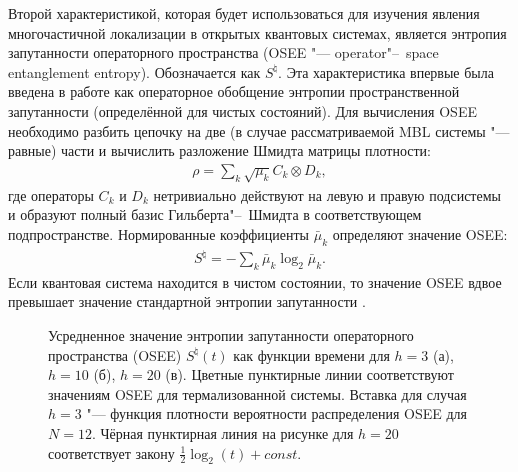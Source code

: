 Второй характеристикой, которая будет использоваться для изучения явления многочастичной локализации в открытых квантовых системах, является энтропия запутанности операторного пространства (OSEE "--- operator"--~space entanglement entropy). Обозначается как \(S^{\natural}\). 
Эта характеристика впервые была введена в работе \cite{Prosen2007} как операторное обобщение энтропии пространственной запутанности (определённой для чистых состояний).
Для вычисления OSEE необходимо разбить цепочку на две (в случае рассматриваемой MBL системы "--- равные) части и вычислить разложение Шмидта матрицы плотности:
\begin{equation}
	\label{eq:mbl_osee_shcmidt}
	\begin{gathered}
		\rho = \sum_{k} \sqrt{\mu_k} C_k \otimes D_k, 
	\end{gathered}
\end{equation}
где операторы \(C_k\) и \(D_k\) нетривиально действуют на левую и правую подсистемы и образуют полный базис Гильберта"--~Шмидта в соответствующем подпространстве.
Нормированные коэффициенты \(\bar{\mu}_k\) определяют значение OSEE:
\begin{equation}
	\label{eq:mbl_osee}
	\begin{gathered}
		S^{\natural} = - \sum_{k} \bar{\mu}_k \log_2{\bar{\mu}_k}. 
	\end{gathered}
\end{equation}
Если квантовая система находится в чистом состоянии, то значение OSEE вдвое превышает значение стандартной энтропии запутанности \cite{Znidaric2008_entropy}.

\begin{figure}[h]
	\legend{}
	\caption[Энтропия запутанности операторного пространства (OSEE)]
	{
		Усредненное значение энтропии запутанности операторного пространства (OSEE) \(S^{\natural}(t)\) как функции времени для \(h=3\) (а), \(h=10\) (б), \(h=20\) (в). Цветные пунктирные линии соответствуют значениям OSEE для термализованной системы. Вставка для случая \(h=3\) "--- функция плотности вероятности распределения OSEE для \(N=12\). Чёрная пунктирная линия на рисунке для \(h=20\) соответствует закону \(\frac{1}{2}\log_2(t) + const\).
	}
	\label{fig:mbl_osee_1}
\end{figure}

